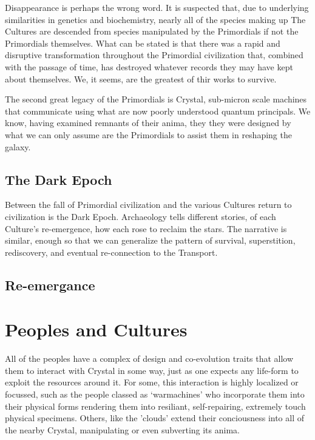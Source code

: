 \documentclass[letterpaper, 12pt]{book}
\begin{document}
Disappearance is perhaps the wrong word.
It is suspected that, due to underlying similarities in genetics and biochemistry, nearly all of the species making up The Cultures are descended from species manipulated by the Primordials if not the Primordials themselves.
What can be stated is that there was a rapid and disruptive transformation throughout the Primordial civilization that, combined with the passage of time, has destroyed whatever records they may have kept about themselves.
We, it seems, are the greatest of thir works to survive.

The second great legacy of the Primordials is Crystal, sub-micron scale machines that communicate using what are now poorly understood quantum principals.
We know, having examined remnants of their anima, they they were designed by what we can only assume are the Primordials to assist them in reshaping the galaxy.
\subsection{The Dark Epoch}
Between the fall of Primordial civilization and the various Cultures return to civilization is the Dark Epoch.
Archaeology tells different stories, of each Culture's re-emergence, how each rose to reclaim the stars.
The narrative is similar, enough so that we can generalize the pattern of survival, superstition, rediscovery, and eventual re-connection to the Transport.
\subsection{Re-emergance}
\section{Peoples and Cultures}
All of the peoples have a complex of design and co-evolution traits that allow them to interact with Crystal in some way, just as one expects any life-form to exploit the resources around it.
For some, this interaction is highly localized or focussed, such as the people classed as `warmachines' who incorporate them into their physical forms rendering them into resiliant, self-repairing, extremely touch physical specimens.
Others, like the 'clouds' extend their conciousness into all of the nearby Crystal, manipulating or even subverting its anima.
\end{document}
